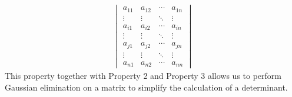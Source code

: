 \documentclass[oneside]{book}
\begin{document}
{{\begin{align}
\begin{vmatrix}
                a_{11} & a_{12} & \cdots & a_{1n}\\
                \vdots & \vdots & \ddots & \vdots\\
                a_{i1} & a_{i2} & \cdots & a_{in}\\
                \vdots & \vdots & \ddots & \vdots\\
                a_{j1} & a_{j2} & \cdots & a_{jn}\\
                \vdots & \vdots & \ddots & \vdots\\
                a_{n1} & a_{n2} & \cdots & a_{nn}
            \end{vmatrix}
        \end{align}
        This property together with Property 2 and Property 3 allows us to perform Gaussian elimination on a matrix to simplify the calculation of a determinant.
    }

}
\end{document}
